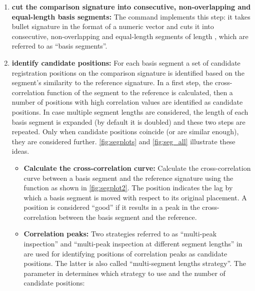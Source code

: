 \begin{enumerate}
\def\labelenumi{\arabic{enumi}.}
\item
  \textbf{cut the comparison signature into consecutive, non-overlapping
  and equal-length basis segments:} The command
   implements this step: it takes bullet
  signature  in the format of a numeric vector and cuts it into
  consecutive, non-overlapping and equal-length segments of length
  , which are referred to as ``basis segments''.
   
\item
  \textbf{identify candidate positions:} For each basis segment a set of
  candidate registration positions on the comparison signature is
  identified based on the segment's similarity to the reference
  signature. In a first step, the cross-correlation function of the
  segment to the reference is calculated, then a number of positions
  with high correlation values are identified as candidate positions. In
  case multiple segment lengths are considered, the length of each basis
  segment is expanded (by default it is doubled) and these two steps are
  repeated. Only when candidate positions coincide (or are similar
  enough), they are considered further. \autoref{fig:segplots} and
  \autoref{fig:seg_all} illustrate these ideas.

  \begin{itemize}
  \item
    \textbf{Calculate the cross-correlation curve:} Calculate the
    cross-correlation curve between a basis segment  and the
    reference signature  using the function
     as shown in \autoref{fig:segplot2}. The
    position indicates the lag by which a basis segment is moved with
    respect to its original placement. A position is considered ``good''
    if it results in a peak in the cross-correlation between the basis
    segment and the reference.
  \item
    \textbf{Correlation peaks:} Two strategies referred to as
    ``multi-peak inspection'' and ``multi-peak inspection at different
    segment lengths'' in \citet{cmps} are used for identifying positions
    of correlation peaks as candidate positions. The latter is also
    called ``multi-segment lengths strategy''. The parameter
     in  determines
    which strategy to use and the number of candidate positions:


\end{itemize}
\end{enumerate}
